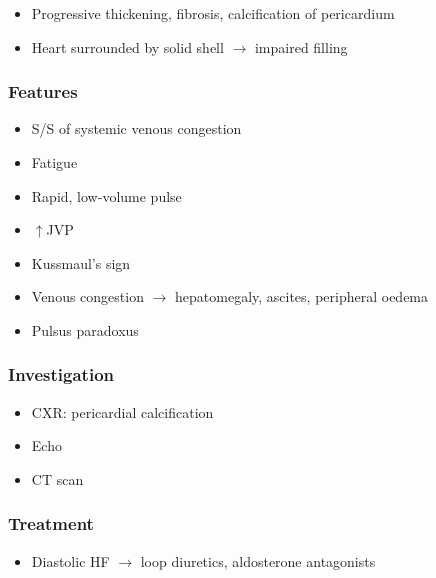 \documentclass[
  12pt,
]{memoir}
\providecommand{\tightlist}{%
  \setlength{\itemsep}{0pt}\setlength{\parskip}{0pt}}
\begin{document}
\begin{itemize}
\tightlist
\item
  Progressive thickening, fibrosis, calcification of pericardium
\item
  Heart surrounded by solid shell \(\rightarrow\) impaired filling
\end{itemize}

\vspace{-3mm}

\hypertarget{features-18}{%
\subsubsection{Features}\label{features-18}}

\begin{itemize}
\tightlist
\item
  S/S of systemic venous congestion
\item
  Fatigue
\item
  Rapid, low-volume pulse
\item
  \(\uparrow\)JVP
\item
  Kussmaul's sign
\item
  Venous congestion \(\rightarrow\) hepatomegaly, ascites, peripheral
  oedema
\item
  Pulsus paradoxus
\end{itemize}

\hypertarget{investigation-21}{%
\subsubsection{Investigation}\label{investigation-21}}

\begin{itemize}
\tightlist
\item
  CXR: pericardial calcification
\item
  Echo
\item
  CT scan
\end{itemize}

\hypertarget{treatment-12}{%
\subsubsection{Treatment}\label{treatment-12}}

\begin{itemize}
\tightlist
\item
  Diastolic HF \(\rightarrow\) loop diuretics, aldosterone antagonists
\end{itemize}
\end{document}
